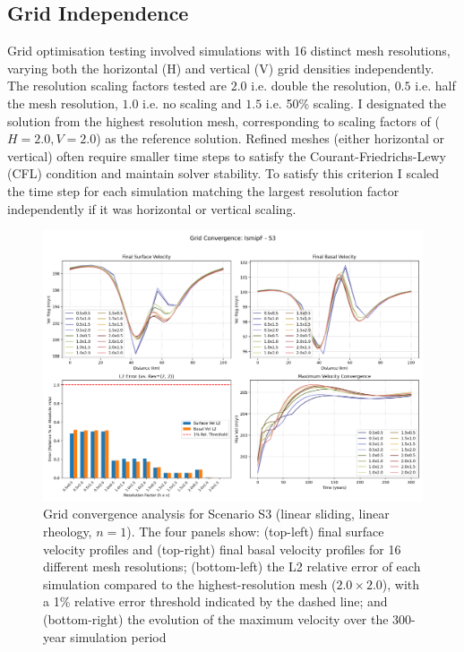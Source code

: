 \subsection{Grid Independence}\label{grid_ind}
Grid optimisation testing involved simulations with 16 distinct mesh resolutions, varying both the horizontal (H) and vertical (V) grid densities independently. The resolution scaling factors tested are $2.0$ i.e. double the resolution, $0.5$ i.e. half the mesh resolution, $1.0$ i.e. no scaling and $1.5$ i.e. 50\% scaling. I designated the solution from the highest resolution mesh, corresponding to scaling factors of ($H=2.0, V=2.0$) as the reference solution. Refined meshes (either horizontal or vertical) often require smaller time steps to satisfy the Courant-Friedrichs-Lewy (CFL) condition and maintain solver stability. To satisfy this criterion I scaled the time step for each simulation matching the largest resolution factor independently if it was horizontal or vertical scaling.
\begin{figure}[H]
    \includegraphics[scale=0.40]{figures/IsmipF_S3_convergence_summary.png}
    \caption{Grid convergence analysis for Scenario S3 (linear sliding, linear rheology, $n=1$). The four panels show: (top-left) final surface velocity profiles and (top-right) final basal velocity profiles for 16 different mesh resolutions; (bottom-left) the L2 relative error of each simulation compared to the highest-resolution mesh ($2.0\times2.0$), with a 1\% relative error threshold indicated by the dashed line; and (bottom-right) the evolution of the maximum velocity over the 300-year simulation period}
    \label{fig:grid_conv_S3}
\end{figure}
